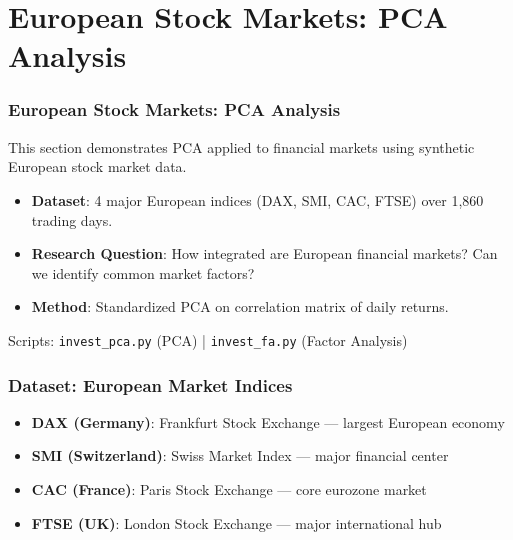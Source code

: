 \documentclass[aspectratio=169]{beamer}
\begin{document}
\section{European Stock Markets: PCA Analysis}

\begin{frame}
    \frametitle{European Stock Markets: PCA Analysis}
    This section demonstrates PCA applied to financial markets using synthetic European stock market data.
    \begin{itemize}
        \item \textbf{Dataset}: 4 major European indices (DAX, SMI, CAC, FTSE) over 1,860 trading days. \pause
        \item \textbf{Research Question}: How integrated are European financial markets? Can we identify common market factors? \pause
        \item \textbf{Method}: Standardized PCA on correlation matrix of daily returns. \pause
    \end{itemize}
    \vspace{6pt}
    Scripts: \texttt{invest\_pca.py} (PCA) | \texttt{invest\_fa.py} (Factor Analysis)
\end{frame}

\begin{frame}
    \frametitle{Dataset: European Market Indices}
    \begin{itemize}
        \item \textbf{DAX (Germany)}: Frankfurt Stock Exchange — largest European economy \pause
        \item \textbf{SMI (Switzerland)}: Swiss Market Index — major financial center \pause
        \item \textbf{CAC (France)}: Paris Stock Exchange — core eurozone market \pause
        \item \textbf{FTSE (UK)}: London Stock Exchange — major international hub \pause
    \end{itemize}
\end{frame}
\end{document}
